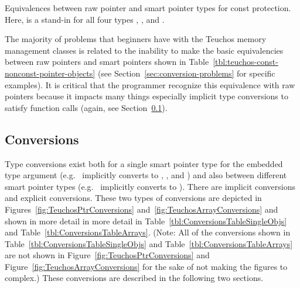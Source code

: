 \documentclass[pdf,ps2pdf,11pt]{SANDreport}
\begin{document}
\begin{table}
%
\begin{center}
%
%

%
%
\end{center}
{}\caption[Equivalences between raw pointer and smart pointer types
for const protection]{
\label{tbl:teuchos-const-nonconst-pointer-objects}
Equivalences between raw pointer and smart pointer types for const
protection.  Here, {} is a stand-in for all four types
{}, {}, {} and {}.}
%
\end{table}

The majority of problems that beginners have with the Teuchos memory
management classes is related to the inability to make the basic
equivalencies between raw pointers and smart pointers shown in
Table~\ref{tbl:teuchos-const-nonconst-pointer-objects} (see
Section~\ref{sec:conversion-problems} for specific examples).  It is
critical that the programmer recognize this equivalence with raw
pointers because it impacts many things especially implicit type
conversions to satisfy function calls (again, see
Section~\ref{sec:conversions}).


%
{}\subsection{Conversions}
\label{sec:conversions}
%

Type conversions exist both for a single smart pointer type for the
embedded type argument (e.g.\ {} implicitly converts
to {}, {}, and {}) and also between different smart pointer types (e.g.\
{} implicitly converts to {}).  There are
implicit conversions and explicit conversions.  These two types of
conversions are depicted in Figures~\ref{fig:TeuchosPtrConversions}
and~\ref{fig:TeuchosArrayConversions} and shown in more detail in
more detail in Table~\ref{tbl:ConversionsTableSingleObjs} and
Table~\ref{tbl:ConversionsTableArrays}.  (Note: All of the conversions
shown in Table~\ref{tbl:ConversionsTableSingleObjs} and
Table~\ref{tbl:ConversionsTableArrays} are not shown in
Figure~\ref{fig:TeuchosPtrConversions} and
Figure~\ref{fig:TeuchosArrayConversions} for the sake of not making
the figures to complex.)  These conversions are described in the
following two sections.
\end{document}
